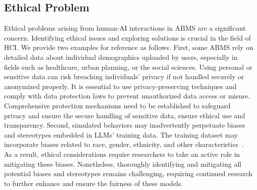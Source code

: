 \subsection{Ethical Problem}
Ethical problems arising from human-AI interactions in ABMS are a significant concern. 
Identifying ethical issues and exploring solutions is crucial in the field of HCI.
We provide two examples for reference as follows.
First, some ABMS rely on detailed data about individual demographics uploaded by users, especially in fields such as healthcare, urban planning, or the social sciences.
Using personal or sensitive data can risk breaching individuals' privacy if not handled securely or anonymized properly.
It is essential to use privacy-preserving techniques and comply with data protection laws to prevent unauthorized data access or misuse.
Comprehensive protection mechanisms need to be established to safeguard privacy and ensure the secure handling of sensitive data, ensure ethical use and transparency.
Second, simulated behaviors may inadvertently perpetuate biases and stereotypes embedded in LLMs' training data.
The training dataset may incorporate biases related to race, gender, ethnicity, and other characteristics~\cite{lucy-bamman-2021-gender}.
As a result, ethical considerations require researchers to take an active role in mitigating these biases.
Nonetheless, thoroughly identifying and mitigating all potential biases and stereotypes remains challenging, requiring continued research to further enhance and ensure the fairness of these models.

